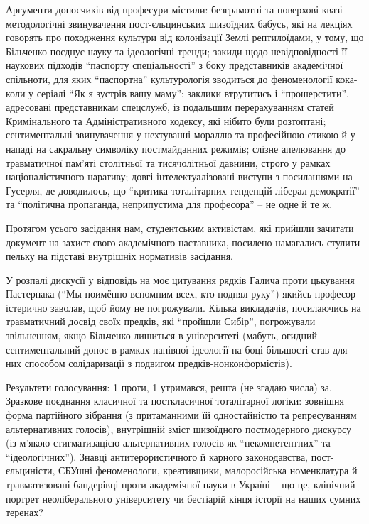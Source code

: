 Аргументи доносчиків від професури містили: безграмотні та поверхові
квазі-методологічні звинувачення пост-єльцинських шизоїдних бабусь, які на
лекціях говорять про походження культури від колонізації Землі рептилоїдами, у
тому, що Більченко поєднує науку та ідеологічні тренди; закиди щодо
невідповідності її наукових підходів \enquote{паспорту спеціальності} з боку
представників академічної спільноти, для яких \enquote{паспортна} культурологія
зводиться до феноменології кока-коли у серіалі \enquote{Як я зустрів вашу маму};
заклики втрутитись і \enquote{прошерстити}, адресовані представникам спецслужб, із
подальшим перерахуванням статей Кримінального та Адміністративного кодексу, які
нібито були розтоптані; сентиментальні звинувачення у нехтуванні мораллю та
професійною етикою й у нападі на сакральну символіку постмайданних режимів;
слізне апелювання до травматичної пам'яті столітньої та тисячолітньої давнини,
строго у рамках націоналістичного наративу; довгі інтелектуалізовані виступи з
посиланнями на Гусерля, де доводилось, що \enquote{критика тоталітарних тенденцій
ліберал-демократії} та \enquote{політична пропаганда, неприпустима для професора} – не
одне й те ж. 

Протягом усього засідання нам, студентським активістам, які
прийшли зачитати документ на захист свого академічного наставника, посилено
намагались стулити пельку на підставі внутрішніх нормативів засідання. 

У розпалі дискусії у відповідь на моє цитування рядків Галича проти цькування
Пастернака (\enquote{Мы поимённо вспомним всех, кто поднял руку}) якийсь
професор істерично заволав, щоб йому не погрожували. Кілька викладачів,
посилаючись на травматичний досвід своїх предків, які \enquote{пройшли Сибір},
погрожували звільненням, якщо Більченко лишиться в університеті (мабуть,
огидний сентиментальний донос в рамках панівної ідеології на боці більшості
став для них способом солідаризації з подвигом предків-нонконформістів).

Результати голосування: 1 проти, 1 утримався, решта (не згадаю числа) за.
Зразкове поєднання класичної та посткласичної тоталітарної логіки: зовнішня
форма партійного зібрання (з притаманними їй одностайністю та репресуванням
альтернативних голосів), внутрішній зміст шизоїдного постмодерного дискурсу (із
м'якою стигматизацією альтернативних голосів як \enquote{некомпетентних} та
\enquote{ідеологічних}). Знавці антитерористичного й карного законодавства,
пост-єльциністи, СБУшні феноменологи, креативщики, малоросійська номенклатура й
травматизовані бандерівці проти академічної науки в Україні – що це, клінічний
портрет неоліберального університету чи бестіарій кінця історії на наших сумних
теренах?

